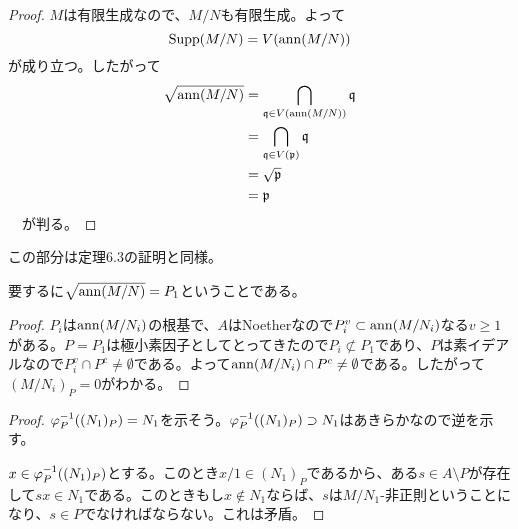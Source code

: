 \begin{proof}
  $M$は有限生成なので、$M/N$も有限生成。よって
  \[
  \operatorname{Supp} (M/N) = V(\operatorname{ann}(M/N))
  \]
  が成り立つ。したがって
  \begin{align*}
    \sqrt{\operatorname{ann}(M/N)} &= \bigcap_{\mathfrak{q} \in V(\operatorname{ann}(M/N))} \mathfrak{q} \\
    &= \bigcap_{\mathfrak{q} \in V(\mathfrak{p})} \mathfrak{q} \\
    &= \sqrt{\mathfrak{p}} \\
    &= \mathfrak{p}
  \end{align*}
　が判る。
\end{proof}





\begin{rem}
  この部分は定理6.3の証明と同様。
\end{rem}



\begin{rem}
  要するに$\sqrt{\operatorname{ann}(M/N)} = P_1$ということである。
\end{rem}



\begin{proof}
  $P_i$は$\operatorname{ann}(M/N_i)$の根基で、$A$はNoetherなので$P_i^{v} \subset \operatorname{ann}(M/N_i)$なる$v \geq 1$がある。$P = P_1$は極小素因子としてとってきたので$P_i \not\subset P_1$であり、$P$は素イデアルなので$P_i^v \cap P^c \neq \emptyset$である。よって$\operatorname{ann}(M/N_i) \cap P^c \neq \emptyset$である。したがって$(M/N_i)_P=0$がわかる。
\end{proof}




\begin{proof}
  ${\varphi}_P^{-1}((N_1)_P) = N_1$を示そう。${\varphi}_P^{-1}((N_1)_P) \supset N_1$はあきらかなので逆を示す。

  $x \in {\varphi}_P^{-1}((N_1)_P)$とする。このとき$x/1 \in (N_1)_P$であるから、ある$s \in A \setminus P$が存在して$s x \in N_1$である。このときもし$x \not\in N_1$ならば、$s$は$M/N_1$-非正則ということになり、$s \in P$でなければならない。これは矛盾。
\end{proof}
